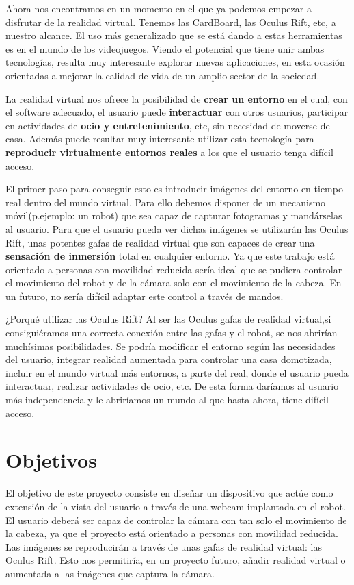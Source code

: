 \documentclass[twoside, 11pt]{epstfg}
\begin{document}
Ahora nos encontramos en un momento en el que ya podemos empezar a disfrutar de la realidad virtual. Tenemos las CardBoard, las Oculus Rift, etc, a nuestro alcance.
El uso más generalizado que se está dando a estas herramientas es en el mundo de los videojuegos.
Viendo el potencial que tiene unir ambas tecnologías, resulta muy interesante explorar nuevas aplicaciones, en esta ocasión orientadas a mejorar la calidad de vida de un amplio sector de la sociedad.


La realidad virtual nos ofrece la posibilidad de \textbf{crear un entorno} en el cual, con el software adecuado, el usuario puede \textbf{interactuar} con otros usuarios, participar en actividades de \textbf{ocio y entretenimiento}, etc, sin necesidad de moverse de casa.
Además puede resultar muy interesante utilizar esta tecnología para \textbf{reproducir virtualmente entornos reales} a los que el usuario tenga difícil acceso.

El primer paso para conseguir esto es introducir imágenes del entorno en tiempo real dentro del mundo virtual. Para ello debemos disponer de un mecanismo móvil(p.ejemplo: un robot) que sea capaz de capturar fotogramas y mandárselas al usuario.  
Para que el usuario pueda ver dichas imágenes se utilizarán las Oculus Rift, unas potentes gafas de realidad virtual que son capaces de crear una \textbf{sensación de inmersión} total en cualquier entorno.
Ya que este trabajo está orientado a personas con movilidad reducida sería ideal que se pudiera controlar el movimiento del robot y de la cámara solo con el movimiento de la cabeza. En un futuro, no sería difícil adaptar este control a través de mandos.

¿Porqué utilizar las Oculus Rift?  Al ser las Oculus gafas de realidad virtual,si consiguiéramos una correcta conexión entre las gafas y el robot, se nos abrirían muchísimas posibilidades. Se podría modificar el entorno según las necesidades del usuario, integrar realidad aumentada para controlar una casa domotizada, incluir en el mundo virtual más entornos, a parte del real, donde el usuario pueda interactuar, realizar actividades de ocio, etc.
De esta forma daríamos al usuario más independencia y le abriríamos un mundo al que hasta ahora, tiene difícil acceso.

\section{Objetivos}\label{Objetivos}
El objetivo de este proyecto consiste en diseñar un dispositivo que actúe como extensión de la vista del usuario a través de una webcam implantada en el robot. El usuario deberá ser capaz de controlar la cámara con tan solo el movimiento de la cabeza, ya que el proyecto está orientado a personas con movilidad reducida.
Las imágenes se reproducirán a través de unas gafas de realidad virtual: las Oculus Rift. Esto nos permitiría, en un proyecto futuro, añadir realidad virtual o aumentada a las imágenes que captura la cámara.
\end{document}
